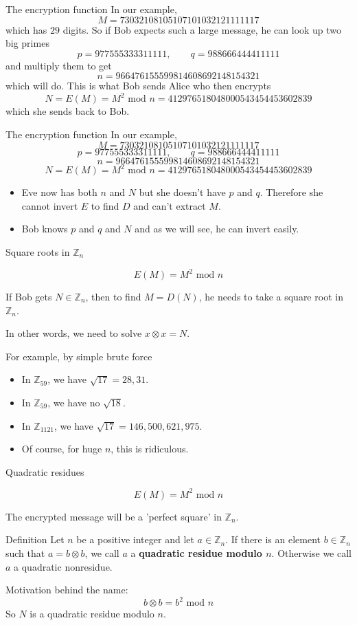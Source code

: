 \documentclass{beamer}
\def\bl[#1]#2{\begin{block}{#1}#2\end{block}}
\def\itemb{\begin{itemize}}
\def\iteme{\end{itemize}}
\begin{document}
\begin{frame}{The encryption function}
In our example,
\[
M=73032108105107101032121111117
\]
which has $29$ digits. So if Bob expects such a large message, he can look up two big primes
\[
p=977555333311111,\qquad q=988666444411111 
\]
and multiply them to get
\[
n=966476155599814608692148154321
\]
which will do. This is what Bob sends Alice who then encrypts
\[
N=E(M)=M^2\textrm{ mod }n=412976518048000543454453602839
\]
which she sends back to Bob.
\end{frame}

\begin{frame}{The encryption function}
In our example,
\[
M=73032108105107101032121111117
\]
\[
p=977555333311111,\qquad q=988666444411111 
\]
\[
n=966476155599814608692148154321
\]
\[
N=E(M)=M^2\textrm{ mod }n=412976518048000543454453602839
\]
\itemb
\item Eve now has both $n$ and $N$ but she doesn't have $p$ and $q$. Therefore she cannot invert $E$ to find $D$ and can't extract $M$.
\item Bob knows $p$ and $q$ and $N$ and as we will see, he can invert easily.
\iteme
\end{frame}

\begin{frame}{Square roots in $\mathbb{Z}_n$}
\bl[]{\[
E(M)=M^2\textrm{ mod }n
\]}
If Bob gets $N\in\mathbb{Z}_n$, then to find $M=D(N)$, he needs to take a square root in $\mathbb{Z}_n$.

\begin{center}\color{red} In other words, we need to solve $x\otimes x=N$.\end{center}
For example, by simple brute force
\itemb
\item In $\mathbb{Z}_{59}$, we have $\sqrt{17}=28,31$.
\item In $\mathbb{Z}_{59}$, we have no $\sqrt{18}$.
\item In $\mathbb{Z}_{1121}$, we have $\sqrt{17}=146,500,621,975$.
\item Of course, for huge $n$, this is ridiculous.
\iteme
\end{frame}

\begin{frame}{Quadratic residues}
\bl[]{\[
E(M)=M^2\textrm{ mod }n
\]}
The encrypted message will be  a 'perfect square' in $\mathbb{Z}_n$.
\bl[Definition]{ Let $n$ be a positive integer and let $a\in\mathbb{Z}_n$. If there is an element $b\in\mathbb{Z}_n$ such that $a=b\otimes b$, we call $a$ a \textbf{quadratic residue modulo $n$}. Otherwise we call $a$ a quadratic nonresidue.}
Motivation behind the name:
\[
b\otimes b=b^2\textrm{ mod }n
\]
So $N$ is a quadratic residue modulo $n$.
\end{frame}
\end{document}
